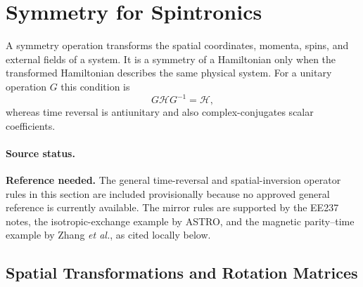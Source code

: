 \section{Symmetry for Spintronics}

A symmetry operation transforms the spatial coordinates, momenta, spins, and
external fields of a system.  It is a symmetry of a Hamiltonian only when the
transformed Hamiltonian describes the same physical system.  For a unitary
operation $G$ this condition is
\begin{equation}
    G\mathcal{H}G^{-1}=\mathcal{H},
    \label{eq:unitary-symmetry-condition}
\end{equation}
whereas time reversal is antiunitary and also complex-conjugates scalar
coefficients.

\paragraph{Source status.}
\textbf{Reference needed.}  The general time-reversal and spatial-inversion
operator rules in this section are included provisionally because no approved
general reference is currently available.  The mirror rules are supported by
the EE237 notes, the isotropic-exchange example by ASTRO, and the magnetic
parity--time example by Zhang \emph{et al.}, as cited locally below.

\subsection{Spatial Transformations and Rotation Matrices}

